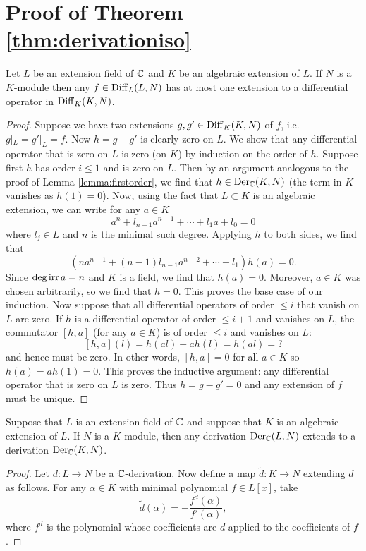 \section{Proof of Theorem \ref{thm:derivationiso}}

\begin{lemma}
    Let $L$ be an extension field of $\mathbb{C}$ and $K$ be an algebraic extension of $L$. If
    $N$ is a $K$-module then any $f\in\operatorname{Diff}_L(L,N)$ has at most one extension to a
    differential operator in $\operatorname{Diff}_K(K,N)$.
    \label{lemma:hart1}
\end{lemma}
\begin{proof}
    Suppose we have two extensions $g,g'\in\operatorname{Diff}_K(K,N)$ of $f$, i.e. $g|_L=g'|_L=f$.
    Now $h=g-g'$ is clearly zero on $L$. 
    We show that any differential operator that is zero on $L$ is zero (on $K$) by induction
    on the order of $h$. Suppose first $h$ has order $i\leqslant 1$ and is zero on $L$.
    Then by an argument analogous to the proof of Lemma \ref{lemma:firstorder}, we
    find that $h\in\operatorname{Der}_{\mathbb{C}}(K,N)$ (the term in $K$ vanishes as $h(1)=0$). Now, using the
    fact that $L\subset K$ is an algebraic extension, we can write for any $a\in K$
    \[a^n+l_{n-1}a^{n-1}+\cdots+l_1a+l_0=0\]
    where $l_j\in L$ and $n$ is the minimal such degree. Applying $h$ to both sides,
    we find that
    \[\left(na^{n-1}+(n-1)l_{n-1}a^{n-2}+\cdots+l_1\right)h(a)=0.\]
    Since $\deg\operatorname{irr} a=n$ and $K$ is a field, we find that $h(a)=0$. Moreover, $a\in K$
    was chosen arbitrarily, so we find that $h=0$. This proves the base case of our
    induction. Now suppose that all differential operators of order $\leqslant i$ that
    vanish on $L$ are zero. If $h$ is a differential operator of order $\leqslant i+1$
    and vanishes on $L$, the commutator $[h,a]$ (for any $a\in K$) is of order
    $\leqslant i$ and vanishes on $L$: %
    \[ [h,a](l) = h(al)-ah(l) = h(al) = ?\]
    and hence must be zero. In other words, $[h,a]=0$ for all $a\in K$ so $h(a)=ah(1)=0$.
    This proves the inductive argument: any differential operator that is zero on $L$
    is zero. Thus $h=g-g'=0$ and any extension of $f$ must be unique.
\end{proof}

\begin{lemma}
    Suppose that $L$ is an extension field of $\mathbb{C}$ and suppose that $K$ is an algebraic
    extension of $L$. If $N$ is a $K$-module, then any derivation $\operatorname{Der}_{\mathbb{C}}(L,N)$ extends
    to a derivation $\operatorname{Der}_{\mathbb{C}}(K,N)$.
    \label{lemma:conrad}
\end{lemma}
\begin{proof}
    Let $d:L\to N$ be a $\mathbb{C}$-derivation. Now define a map $\tilde d:K\to N$ extending $d$
    as follows. For any $\alpha\in K$ with minimal polynomial $f\in L[x]$, take
    \[\tilde d(\alpha) = -\frac{f^{d}(\alpha)}{f'(\alpha)},\]
    where $f^d$ is the polynomial whose coefficients are $d$ applied to the coefficients
    of $f$. %
\end{proof}

